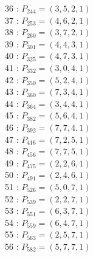 \documentclass{article}
\begin{document}
{\begin{multicols}{3}
36 : $P_{244}=( 3, 5, 2, 1 )$\\
37 : $P_{253}=( 4, 6, 2, 1 )$\\
38 : $P_{260}=( 3, 7, 2, 1 )$\\
39 : $P_{301}=( 4, 4, 3, 1 )$\\
40 : $P_{325}=( 4, 7, 3, 1 )$\\
41 : $P_{332}=( 3, 0, 4, 1 )$\\
42 : $P_{350}=( 5, 2, 4, 1 )$\\
43 : $P_{360}=( 7, 3, 4, 1 )$\\
44 : $P_{364}=( 3, 4, 4, 1 )$\\
45 : $P_{382}=( 5, 6, 4, 1 )$\\
46 : $P_{392}=( 7, 7, 4, 1 )$\\
47 : $P_{416}=( 7, 2, 5, 1 )$\\
48 : $P_{456}=( 7, 7, 5, 1 )$\\
49 : $P_{475}=( 2, 2, 6, 1 )$\\
50 : $P_{491}=( 2, 4, 6, 1 )$\\
51 : $P_{526}=( 5, 0, 7, 1 )$\\
52 : $P_{539}=( 2, 2, 7, 1 )$\\
53 : $P_{551}=( 6, 3, 7, 1 )$\\
54 : $P_{559}=( 6, 4, 7, 1 )$\\
55 : $P_{563}=( 2, 5, 7, 1 )$\\
56 : $P_{582}=( 5, 7, 7, 1 )$\\
\end{multicols}


%


%


}%
\end{document}
